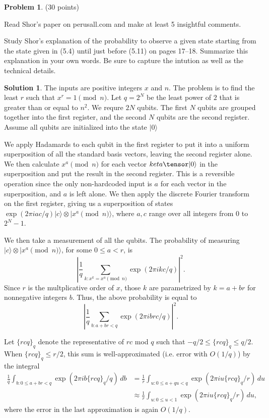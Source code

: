 \documentclass{article}
\theoremstyle{definition}
\newtheorem{problem}{Problem}
\newtheorem*{solution}{Solution}
\newcommand{\ket}[1]{|#1\rangle}
\begin{document}
\begin{problem} (30 points) 
\begin{compactenum}[(a)]
\item Read Shor's paper on perusall.com and make at least 5 insightful comments. 
\item Study Shor's explanation of the probability to observe a given state starting from the state given in (5.4) until just before (5.11) on pages 17--18. Summarize this explanation in your own words. Be sure to capture the intution as well as the technical details. 
\end{compactenum}
\end{problem}
\begin{solution}
The inputs are positive integers $x$ and $n$.  The problem is to find the least $r$ such that $x^r = 1 \pmod{n}$.  Let $q = 2^N$ be the least power of $2$ that is greater than or equal to $n^2$.  We requre $2N$ qubits.  The first $N$ qubits are grouped together into the first register, and the second $N$ qubits are the second register.  Assume all qubits are initialized into the state $\ket{0}$

We apply Hadamards to each qubit in the first register to put it into a uniform superposition of all the standard basis vectors, leaving the second register alone. We then calculate $x^a \pmod{n}$ for each vector $ket{a}\tensor \ket{0}$ in the superposition and put the result in the second register.  This is a reversible operation since the only non-hardcoded input is $a$ for each vector in the superposition, and $a$ is left alone. We then apply the discrete Fourier transform on the first register, giving us a superposition of states $\exp(2\pi i a c/q) \ket{c} \otimes \ket{x^a \pmod{n}}$, where $a,c$ range over all integers from $0$ to $2^N-1$.  

We then take a measurement of all the qubits.  The probability of measuring $\ket{c} \otimes \ket{x^a \pmod{n}}$, for some $0 \le a < r$, is
$$ \left| \frac{1}{q} \sum_{k: x^k = x^a \pmod{n}} \exp(2\pi i k c/q) \right|^2.$$ 
Since $r$ is the multplicative order of $x$, those $k$ are parametrized by $k = a + br$ for nonnegative integers $b$.  Thus, the above probability is equal to
$$ \left| \frac{1}{q} \sum_{b: a + br < q} \exp(2\pi i  b r c/q) \right|^2.$$ 

\newcommand{\rcq}{\{rcq\}_q}

Let $\rcq$ denote the representative of $rc$ mod $q$ such that $-q/2 \le \rcq \le q/2$.  When $\rcq \le r/2$,
 this sum is well-approximated (i.e. error with $O(1/q)$) by the integral
\begin{align*}
\frac{1}{q} \int_{b:0 \le a + br < q}  \exp(2\pi i  b \rcq /q) \, db & = \frac{1}{r} \int_{u:0 \le a + qu < q}  \exp(2\pi i u \rcq /r) \, du \\
 & \approx \frac{1}{r} \int_{u:0 \le u < 1}  \exp(2\pi i  u \rcq /r) \, du,
\end{align*}
where the error in the last approximation is again $O(1/q)$.


\end{solution}
\end{document}
